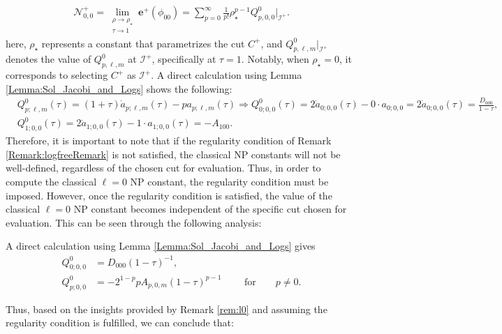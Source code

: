\begin{align}
  \mathcal{N}^{+}_{0,0}= \lim_{\substack{\rho \to \rho_{\star} \\ \tau \to 1}}  \boldsymbol{e}^{+}(\phi_{00}) = \sum_{p=0}^{\infty} \frac{1}{p!}\rho^{p-1}_{\star}Q^{0}_{p,0,0}|_{\mathscr{I}^{+}}.
\end{align}
here, $\rho_{\star}$ represents a constant that parametrizes the cut ${C}^{+}$, and $Q^{0}_{p,\ell,m}|_{\mathscr{I}^{+}}$ denotes the value of $Q^{0}_{p,\ell,m}$ at $\mathscr{I}^{+}$, specifically at $\tau=1$. Notably, when $\rho_{\star}=0$, it corresponds to selecting ${C}^{+}$ as $\mathcal{I}^{+}$.
A direct calculation using Lemma \ref{Lemma:Sol_Jacobi_and_Logs} shows the following:
\begin{align}\label{eq:Q0lm}
  & Q_{p;\ell,m}^{0}(\tau)=(1+\tau) \dot{a}_{p ; \ell, m}(\tau)-pa_{p ; \ell, m}(\tau) \Rightarrow Q_{0;0,0}^{0}(\tau)=2 \dot{a}_{0;0,0}(\tau)-0 \cdot a_{0;0,0} =2 \dot{a}_{0;0,0}(\tau)=\frac{D_{000}}{1-\tau}, \\
  & Q_{1;0,0}^{0}(\tau)=2 \dot{a}_{1;0,0}(\tau)-1 \cdot a_{1;0,0}(\tau)=-A_{100}.
\end{align}
Therefore, it is important to note that if the regularity condition of Remark \ref{Remark:logfreeRemark} is not satisfied, the classical NP constants will not be well-defined, regardless of the chosen cut for evaluation. Thus, in order to compute the classical $\ell=0$ NP constant, the regularity condition must be imposed. However, once the regularity condition is satisfied, the value of the classical $\ell=0$ NP constant becomes independent of the specific cut chosen for evaluation. This can be seen through the following analysis:
\begin{remark}\label{rem:l0}
  A direct calculation
using Lemma \ref{Lemma:Sol_Jacobi_and_Logs}
gives
 \begin{subequations}\label{eq:rem:l0}
 \begin{align}
   Q^{0}_{0;0,0}&=D_{000}(1-\tau)^{-1},\label{rem:l0:eq1} \\
   Q^{0}_{p;0,0}&=-2^{1-p}pA_{p,0,m}(1-\tau)^{p-1} \qquad \text{ for}\qquad p\neq 0.
   \label{rem:l0:eq2}
 \end{align}
\end{subequations}
\end{remark}
Thus, based on the insights provided by Remark \ref{rem:l0} and assuming the regularity condition is fulfilled, we can conclude that:

